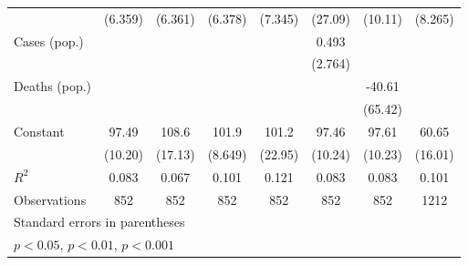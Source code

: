 \documentclass{article}
\begin{document}
{\begin{longtable}{l*{7}{c}}
                &  (6.359)         &  (6.361)         &  (6.378)         &  (7.345)         &  (27.09)         &  (10.11)         &  (8.265)         \\
Cases (pop.)    &                  &                  &                  &                  &    0.493         &                  &                  \\
                &                  &                  &                  &                  &  (2.764)         &                  &                  \\
Deaths (pop.)   &                  &                  &                  &                  &                  &   -40.61         &                  \\
                &                  &                  &                  &                  &                  &  (65.42)         &                  \\
Constant        &    97.49\sym{***}&    108.6\sym{**} &    101.9\sym{***}&    101.2\sym{**} &    97.46\sym{***}&    97.61\sym{***}&    60.65\sym{*}  \\
                &  (10.20)         &  (17.13)         &  (8.649)         &  (22.95)         &  (10.24)         &  (10.23)         &  (16.01)         \\
\hline
\(R^{2}\)       &    0.083         &    0.067         &    0.101         &    0.121         &    0.083         &    0.083         &    0.101         \\
Observations    &      852         &      852         &      852         &      852         &      852         &      852         &     1212         \\
\hline\hline
\multicolumn{8}{l}{\footnotesize Standard errors in parentheses}\\
\multicolumn{8}{l}{\footnotesize \sym{*} \(p<0.05\), \sym{**} \(p<0.01\), \sym{***} \(p<0.001\)}\\
\end{longtable}
}
\end{document}
